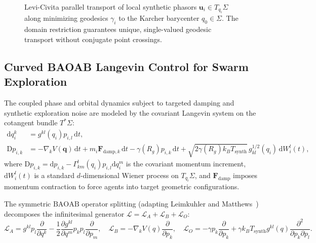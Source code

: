 \documentclass[11pt,a4paper,reqno]{article}
\theoremstyle{plain}
\theoremstyle{definition}
\theoremstyle{remark}
\numberwithin{equation}{section}
\begin{document}
\begin{figure}[htbp]
\caption{Levi-Civita parallel transport of local synthetic phasors $\bm{u}_i \in T_{q_i}\Sigma$ along minimizing geodesics $\gamma_i$ to the Karcher barycenter $q_0 \in \Sigma$. The domain restriction guarantees unique, single-valued geodesic transport without conjugate point crossings.}
\label{fig:covariant_phasors}
\end{figure}

\subsection{Curved BAOAB Langevin Control for Swarm Exploration}
The coupled phase and orbital dynamics subject to targeted damping and synthetic exploration noise are modeled by the covariant Langevin system on the cotangent bundle $T^*\Sigma$:
\begin{align}
\mathrm{d}q_i^k &= g^{kl}(q_i) p_{i, l} \, \mathrm{d}t, \label{eq:langevin_q} \\
\mathrm{D}p_{i, k} &= -\nabla_k V(\bm{q}) \, \mathrm{d}t + m_i \mathbf{F}_{\mathrm{damp}, k} \, \mathrm{d}t - \gamma(R_g) p_{i, k} \, \mathrm{d}t + \sqrt{2 \gamma(R_g) k_B T_{\mathrm{synth}}} \, g_{kl}^{1/2}(q_i) \, \mathrm{d}W_i^l(t), \label{eq:langevin_p}
\end{align}
where $\mathrm{D}p_{i, k} = \mathrm{d}p_{i, k} - \Gamma_{km}^l(q_i) p_{i, l} \mathrm{d}q_i^m$ is the covariant momentum increment, $\mathrm{d}W_i^l(t)$ is a standard $d$-dimensional Wiener process on $T_{q_i}\Sigma$, and $\mathbf{F}_{\mathrm{damp}}$ imposes momentum contraction to force agents into target geometric configurations. 

The symmetric $\mathrm{BAOAB}$ operator splitting (adapting Leimkuhler and Matthews~\cite{LeimkuhlerMatthews2013}) decomposes the infinitesimal generator $\mathcal{L} = \mathcal{L}_A + \mathcal{L}_B + \mathcal{L}_O$:
\begin{equation}
\mathcal{L}_A = g^{kl} p_l \frac{\partial}{\partial q^k} - \frac{1}{2} \frac{\partial g^{kl}}{\partial q^m} p_k p_l \frac{\partial}{\partial p_m}, \quad \mathcal{L}_B = -\nabla_k V(q) \frac{\partial}{\partial p_k}, \quad \mathcal{L}_O = -\gamma p_k \frac{\partial}{\partial p_k} + \gamma k_B T_{\mathrm{synth}} g^{kl}(q) \frac{\partial^2}{\partial p_k \partial p_l}.
\end{equation}
\end{document}
